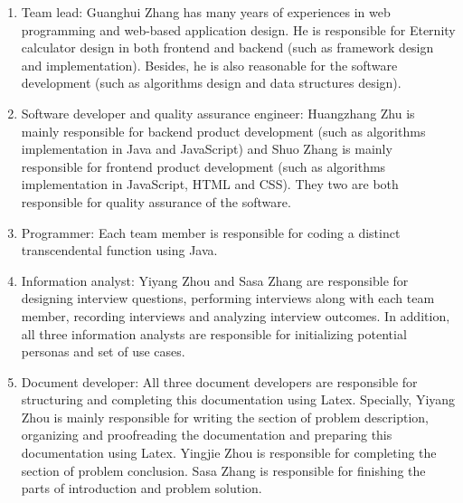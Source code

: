 \documentclass[12pt]{article}
\begin{document}
\begin{enumerate}
    \item Team lead: \newline
    Guanghui Zhang has many years of experiences in web programming and web-based application design. He is responsible for Eternity calculator design in both frontend and backend (such as framework design and implementation). Besides, he is also reasonable for the software development (such as algorithms design and data structures design).
    \item Software developer and quality assurance engineer: \newline
    Huangzhang Zhu is mainly responsible for backend product development (such as algorithms implementation in Java and JavaScript) and Shuo Zhang is mainly responsible for frontend product development (such as algorithms implementation in JavaScript, HTML and CSS). They two are both responsible for quality assurance of the software.
    \item Programmer: \newline
    Each team member is responsible for coding a distinct transcendental function using Java.
    \item Information analyst: \newline
    Yiyang Zhou and Sasa Zhang are responsible for designing interview questions, performing interviews along with each team member, recording interviews and analyzing interview outcomes. In addition, all three information analysts are responsible for initializing potential personas and set of use cases.
    \item Document developer: \newline
    All three document developers are responsible for structuring and completing this documentation using Latex. Specially, Yiyang Zhou is mainly responsible for writing the section of problem description, organizing and proofreading the documentation and preparing this documentation using Latex. Yingjie Zhou is responsible for completing the section of problem conclusion. Sasa Zhang is responsible for finishing the parts of introduction and problem solution.
\end{enumerate}
\end{document}
